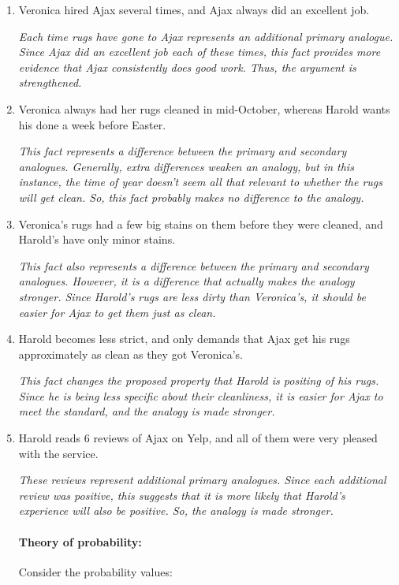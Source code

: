 \documentclass[10pt]{article}
\begin{document}
\begin{enumerate} \itemsep7mm

\item Veronica hired Ajax several times, and Ajax always did an excellent job.

\textit{Each time rugs have gone to Ajax represents an additional primary analogue.  Since Ajax did an excellent job each of these times, this fact provides more evidence that Ajax consistently does good work.  Thus, the argument is strengthened.}

\item Veronica always had her rugs cleaned in mid-October, whereas Harold wants his done a week before Easter.

\textit{This fact represents a difference between the primary and secondary analogues.  Generally, extra differences weaken an analogy, but in this instance, the time of year doesn't seem all that relevant to whether the rugs will get clean.  So, this fact probably makes no difference to the analogy.}

\item Veronica's rugs had a few big stains on them before they were cleaned, and Harold's have only minor stains.

\textit{This fact also represents a difference between the primary and secondary analogues.  However, it is a difference that actually makes the analogy stronger. Since Harold's rugs are less dirty than Veronica's, it should be easier for Ajax to get them just as clean.}

\item Harold becomes less strict, and only demands that Ajax get his rugs approximately as clean as they got Veronica's.

\textit{This fact changes the proposed property that Harold is positing of his rugs.  Since he is being less specific about their cleanliness, it is easier for Ajax to meet the standard, and the analogy is made stronger.}

\item Harold reads 6 reviews of Ajax on Yelp, and all of them were very pleased with the service.

\textit{These reviews represent additional primary analogues.  Since each additional review was positive, this suggests that it is more likely that Harold's experience will also be positive.  So, the analogy is made stronger.}


\paragraph{Theory of probability:} Consider the probability values: 


\end{enumerate}
\end{document}
